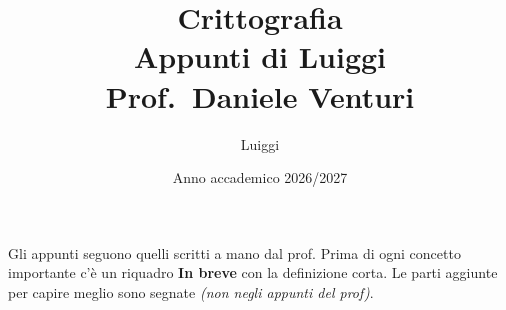 \documentclass[11pt,a4paper]{report}
\title{\textbf{Crittografia}\\[0.5em]\large Appunti di Luiggi\\[0.3em]\normalsize Prof.\ Daniele Venturi}
\author{Luiggi}
\date{Anno accademico 2026/2027}
\begin{document}
\maketitle

\noindent Gli appunti seguono quelli scritti a mano dal prof. Prima di ogni concetto importante c'è un riquadro \textbf{In breve} con la definizione corta. Le parti aggiunte per capire meglio sono segnate \textit{(non negli appunti del prof)}.

\tableofcontents







\appendix

\end{document}

